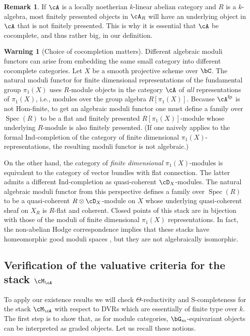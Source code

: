 \documentclass[a4paper]{amsart}
\numberwithin{equation}{section}
\theoremstyle{plain}
\theoremstyle{definition}
\newtheorem{rem}[thm]{Remark}
\newtheorem{warn}[thm]{Warning}
\DeclareMathOperator{\Spec}{Spec}
\begin{document}
\begin{rem}
If $\cA$ is a locally noetherian $k$-linear abelian category and $R$ is a $k$-algebra, most finitely presented objects in $\cA_R$ will have an underlying object in $\cA$ that is not finitely presented. This is why it is essential that $\cA$ be cocomplete, and thus rather big, in our definition.
\end{rem}

\begin{warn}[Choice of cocompletion matters]
Different algebraic moduli functors can arise from embedding the same small category into different cocomplete categories. Let $X$ be a smooth projective scheme over $\bC$. The natural moduli functor for finite dimensional representations of the fundamental group $\pi_1(X)$ uses $R$-module objects in the category $\cA$ of \emph{all} representations of $\pi_1(X)$, i.e., modules over the group algebra $R[\pi_1(X)]$. Because $\cA^{\rm fp}$ is not Hom-finite, to get an algebraic moduli functor one must define a family over $\Spec(R)$ to be a flat and finitely presented $R[\pi_1(X)]$-module whose underlying $R$-module is also finitely presented. (If one naively applies  to the formal Ind-completion of the category of finite dimensional $\pi_1(X)$-representations, the resulting moduli functor is not algebraic.)

On the other hand, the category of \emph{finite dimensional} $\pi_1(X)$-modules is equivalent to the category of vector bundles with flat connection. The latter admits a different Ind-completion as quasi-coherent $\cD_X$-modules. The natural algebraic moduli functor from this perspective defines a family over $\Spec(R)$ to be a quasi-coherent $R \otimes \cD_X$-module on $X$ whose underlying quasi-coherent sheaf on $X_R$ is $R$-flat and coherent. Closed points of this stack are in bijection with those of the moduli of finite dimensional $\pi_1(X)$ representations. In fact, the non-abelian Hodge correspondence implies that these stacks have homeomorphic good moduli spaces \cite[Sect.~7]{simpson}, but they are not algebraically isomorphic.

\end{warn}



\subsection{Verification of the valuative criteria for the stack \texorpdfstring{$\cM_\cA$}{MA}}
To apply our existence results we will check $\Theta$-reductivity and  {\textsf{S}}-completeness for the stack $\cM_{\cA}$ with respect to DVRs which are essentially of finite type over $k$. The first step is to show that, as for module categories, $\bG_m$-equivariant objects can be interpreted as graded objects. Let us recall these notions.
\end{document}
